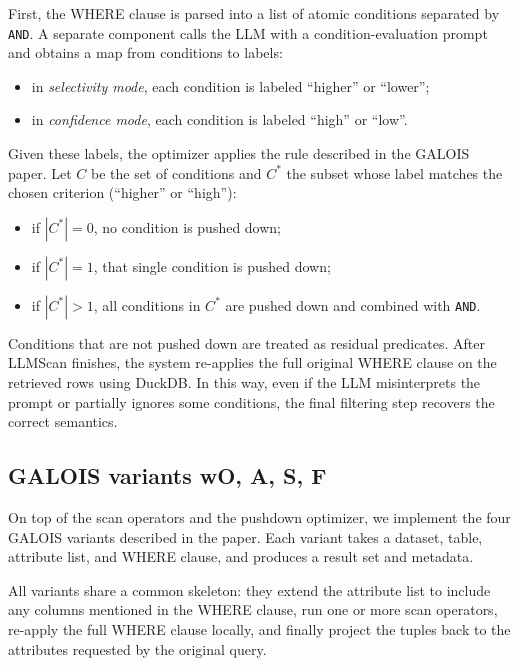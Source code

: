 \documentclass[11pt]{article}
\begin{document}
First, the WHERE clause is parsed into a list of atomic conditions separated by
\texttt{AND}. A separate component calls the LLM with a condition-evaluation prompt
and obtains a map from conditions to labels:

\begin{itemize}
  \item in \emph{selectivity mode}, each condition is labeled ``higher'' or ``lower'';
  \item in \emph{confidence mode}, each condition is labeled ``high'' or ``low''.
\end{itemize}

Given these labels, the optimizer applies the rule described in the GALOIS paper. Let
$C$ be the set of conditions and $C^\ast$ the subset whose label matches the chosen
criterion (``higher'' or ``high''):

\begin{itemize}
  \item if $|C^\ast| = 0$, no condition is pushed down;
  \item if $|C^\ast| = 1$, that single condition is pushed down;
  \item if $|C^\ast| > 1$, all conditions in $C^\ast$ are pushed down and combined with
        \texttt{AND}.
\end{itemize}

Conditions that are not pushed down are treated as residual predicates. After
LLMScan finishes, the system re-applies the full original WHERE clause on the retrieved
rows using DuckDB. In this way, even if the LLM misinterprets the prompt or partially
ignores some conditions, the final filtering step recovers the correct semantics.

\subsection{GALOIS variants wO, A, S, F}

On top of the scan operators and the pushdown optimizer, we implement the four
GALOIS variants described in the paper. Each variant takes a dataset, table, attribute
list, and WHERE clause, and produces a result set and metadata.

All variants share a common skeleton: they extend the attribute list to include any
columns mentioned in the WHERE clause, run one or more scan operators, re-apply the
full WHERE clause locally, and finally project the tuples back to the attributes requested
by the original query.
\end{document}
